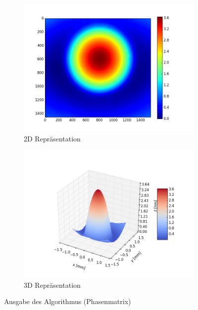 \begin{figure}[htbp]
	\centering
	\begin{subfigure}[b]{0.45\textwidth}
		\centering
		\includegraphics[width=\textwidth]{img/2D_E10001_edf_ref_start0001_1-10_edf}
		\caption[2D Ausgabe]{2D Repräsentation}
		\label{fig:ausgabe_2d}
	\end{subfigure}
	\begin{subfigure}[b]{0.45\textwidth}
		\centering
		\includegraphics[width=\textwidth]{img/3D_E10001_edf_ref_start0001_1-10_edf}
		\caption[3D Ausgabe]{3D Repräsentation}
		\label{fig:ausgabe_3d}
	\end{subfigure}
	\caption[Ausgabe]{Ausgabe des Algorithmus (Phasenmatrix)}
	\label{fig:ausgabebild}
\end{figure}

